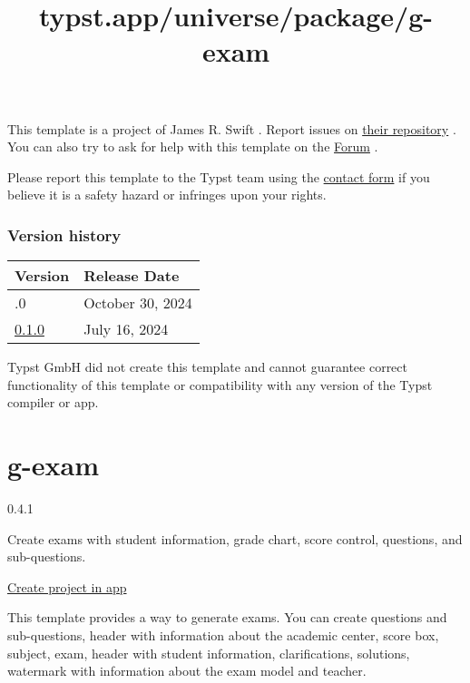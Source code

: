 This template is a project of James R. Swift . Report issues on
\href{https://github.com/JamesxX/graceful-genetics}{their repository} .
You can also try to ask for help with this template on the
\href{https://forum.typst.app}{Forum} .

Please report this template to the Typst team using the
\href{https://typst.app/contact}{contact form} if you believe it is a
safety hazard or infringes upon your rights.

\label{versions}
\subsubsection{Version history}\label{version-history}

\begin{longtable}[]{@{}ll@{}}
\toprule\noalign{}
Version & Release Date \\
\midrule\noalign{}
\endhead
\bottomrule\noalign{}
\endlastfoot
0.2.0 & October 30, 2024 \\
\href{https://typst.app/universe/package/graceful-genetics/0.1.0/}{0.1.0}
& July 16, 2024 \\
\end{longtable}

Typst GmbH did not create this template and cannot guarantee correct
functionality of this template or compatibility with any version of the
Typst compiler or app.


\title{typst.app/universe/package/g-exam}

\label{banner}
\label{template-thumbnail}

\section{g-exam}\label{g-exam}

{ 0.4.1 }

Create exams with student information, grade chart, score control,
questions, and sub-questions.

\href{/app?template=g-exam&version=0.4.1}{Create project in app}

\label{readme}
This template provides a way to generate exams. You can create questions
and sub-questions, header with information about the academic center,
score box, subject, exam, header with student information,
clarifications, solutions, watermark with information about the exam
model and teacher.

